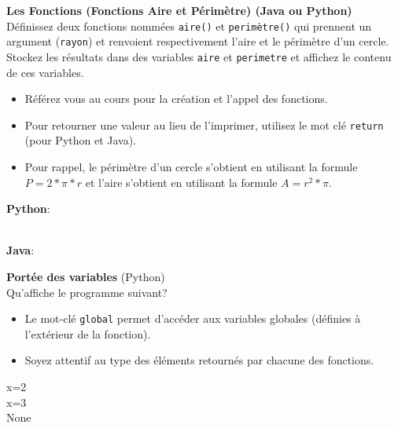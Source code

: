   \begin{Exercice}[5 minutes] \textbf{Les Fonctions (Fonctions Aire et Périmètre) (Java ou Python)}\\
      Définissez deux fonctions nommées \lstinline{aire()} et \lstinline{perimètre()} qui prennent un argument (\lstinline{rayon}) et renvoient respectivement l'aire et le périmètre d'un cercle. Stockez les résultats dans des variables \lstinline{aire} et \lstinline{perimetre} et affichez le contenu de ces variables.   \\
     
      \begin{conseil}
          \begin{itemize}
              \item Référez vous au cours pour la création et l'appel des fonctions.
              \item Pour retourner une valeur au lieu de l'imprimer, utilisez le mot clé \lstinline{return} (pour Python et Java).
              \item Pour rappel, le périmètre d'un cercle s'obtient en utilisant la formule $P = 2*\pi*r$ et l'aire s'obtient en utilisant la formule $A = r^2*\pi$.
          \end{itemize}        
      \end{conseil}
      \begin{solution}
          \textbf{Python}:
          
          
          \textbf{\\Java}:
          
      \end{solution}   
  \end{Exercice} 

  \begin{Exercice}[5 minutes] \textbf{Portée des variables} (Python)\\
    Qu'affiche le programme suivant? \\

    

    
     \begin{conseil}
        \begin{itemize}
            \item Le mot-clé \lstinline{global} permet d'accéder aux variables globales (définies à l'extérieur de la fonction).
            \item Soyez attentif au type des éléments retournés par chacune des fonctions.
        \end{itemize}
     \end{conseil}
     \begin{solution}
            x=2 \\
            x=3 \\
            None   
    \end{solution}
 \end{Exercice}


